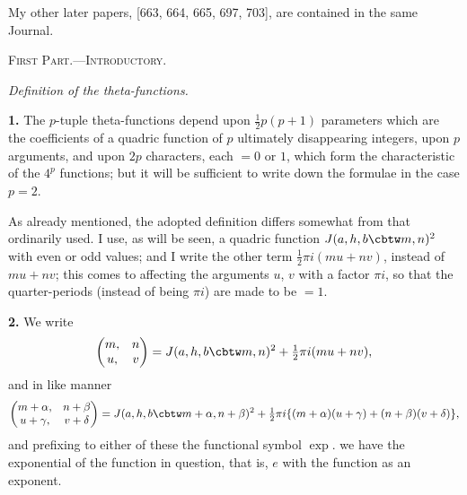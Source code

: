 \documentclass[11pt,a4paper]{book}
\begin{document}
My other later papers, [663, 664, 665, 697, 703], are contained in the same Journal.

\vspace{1em}

\begin{center}
\textsc{First Part.---Introductory.}
\end{center}

\vspace{0.5em}

\begin{center}
\textit{Definition of the theta-functions.}
\end{center}

\vspace{0.5em}

\noindent\textbf{1.}\quad
The $p$-tuple theta-functions depend upon $\frac{1}{2}p(p+1)$ parameters which are the coefficients of a quadric function of $p$ ultimately disappearing integers, upon $p$ arguments, and upon $2p$ characters, each $= 0$ or $1$, which form the characteristic of the $4^p$ functions; but it will be sufficient to write down the formulae in the case $p = 2$.

As already mentioned, the adopted definition differs somewhat from that ordinarily used. I use, as will be seen, a quadric function $J(a, h, b\cbtw m, n)^2$ with even or odd values; and I write the other term $\frac{1}{2}\pi i(mu + nv)$, instead of $mu + nv$; this comes to affecting the arguments $u$, $v$ with a factor $\pi i$, so that the quarter-periods (instead of being $\pi i$) are made to be $= 1$.

\noindent\textbf{2.}\quad
We write
\[
\begin{pmatrix} m, & n \\ u, & v \end{pmatrix} = J(a, h, b\cbtw m, n)^2 + \tfrac{1}{2}\pi i(mu + nv),
\]
and in like manner
\[
\begin{pmatrix} m + \alpha, & n + \beta \\ u + \gamma, & v + \delta \end{pmatrix} = J(a, h, b\cbtw m + \alpha, n + \beta)^2 + \tfrac{1}{2}\pi i\{(m + \alpha)(u + \gamma) + (n + \beta)(v + \delta)\},
\]
and prefixing to either of these the functional symbol $\exp.$ we have the exponential of the function in question, that is, $e$ with the function as an exponent.
\end{document}
